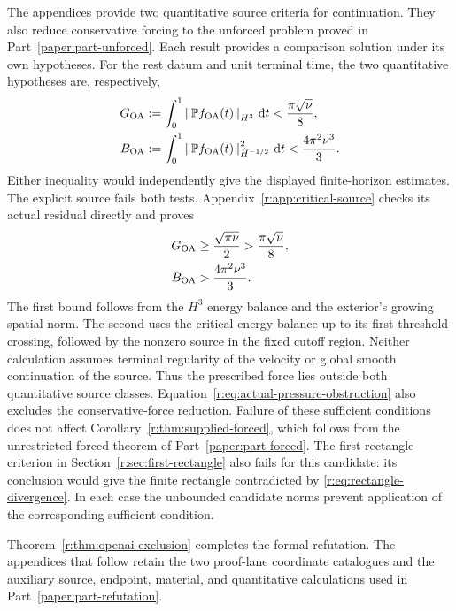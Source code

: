 The appendices provide two quantitative source criteria for
continuation. They also reduce conservative forcing to the unforced
problem proved in Part~\ref{paper:part-unforced}. Each result
provides a comparison solution under its own hypotheses.
For the rest datum and unit terminal time, the two quantitative
hypotheses are, respectively,
\begin{equation}
 \begin{aligned}
 G_{\rm OA}&:=\int_0^1\left\lVert \mathbb P f_{\rm OA}(t)\right\rVert_{H^3}\,\mathrm d t
             <\frac{\pi\sqrt\nu}{8},\\
 B_{\rm OA}&:=\int_0^1\left\lVert \mathbb P f_{\rm OA}(t)\right\rVert_{\dot H^{-1/2}}^2\,\mathrm d t
             <\frac{4\pi^2\nu^3}{3}.
 \end{aligned}
 \label{r:eq:candidate-admission}
\end{equation}
Either inequality would independently give the displayed finite-horizon
estimates.
The explicit source fails both tests. Appendix~\ref{r:app:critical-source}
checks its actual residual directly and proves
\begin{equation}
 \begin{aligned}
 G_{\rm OA}&\ge\frac{\sqrt{\pi\nu}}2
                >\frac{\pi\sqrt\nu}{8},\\
 B_{\rm OA}&>\frac{4\pi^2\nu^3}{3}.
 \end{aligned}
 \label{r:eq:necessary-admission-budgets}
\end{equation}
The first bound follows from the \(H^3\) energy balance and the
exterior's growing spatial norm. The second uses the critical energy
balance up to its first threshold crossing, followed by the nonzero
source in the fixed cutoff region. Neither calculation assumes terminal
regularity of the velocity or global smooth continuation of the source.
Thus the prescribed force lies outside both quantitative source
classes. Equation~\eqref{r:eq:actual-pressure-obstruction} also excludes
the conservative-force reduction. Failure of these sufficient conditions does
not affect Corollary~\ref{r:thm:supplied-forced}, which follows from the
unrestricted forced theorem of Part~\ref{paper:part-forced}.
The first-rectangle criterion in Section~\ref{r:sec:first-rectangle}
also fails for this candidate: its conclusion would give the finite
rectangle contradicted by \eqref{r:eq:rectangle-divergence}.
In each case the unbounded candidate norms prevent application
of the corresponding sufficient condition.


Theorem~\ref{r:thm:openai-exclusion} completes the formal refutation.  The
appendices that follow retain the two proof-lane coordinate catalogues and the
auxiliary source, endpoint, material, and quantitative calculations used in
Part~\ref{paper:part-refutation}.
\appendix

